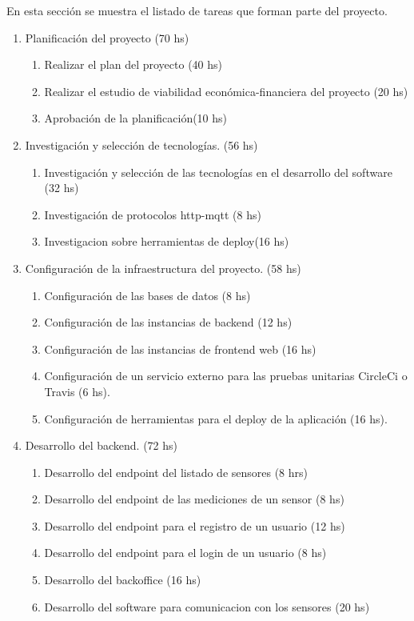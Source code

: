 \documentclass[
11pt, %
]{charter}
\begin{document}
En esta sección se muestra el listado de tareas que forman parte del proyecto.
\begin{enumerate}
\item Planificación del proyecto (70 hs)
	\begin{enumerate}
	\item Realizar el plan del proyecto (40 hs)
	\item Realizar el estudio de viabilidad económica-financiera del proyecto (20 hs)
	\item Aprobación de la planificación(10 hs)
	\end{enumerate}
\item Investigación y selección de tecnologías. (56 hs)
	\begin{enumerate}
	\item Investigación y selección de las tecnologías en el desarrollo del software (32 hs)
	\item Investigación de protocolos http-mqtt (8 hs)
	\item Investigacion sobre herramientas de deploy(16 hs)
	\end{enumerate}
\item Configuración de la infraestructura del proyecto. (58 hs)
	\begin{enumerate}
	\item Configuración de las bases de datos (8 hs)
	\item Configuración de las instancias de backend (12 hs)
	\item Configuración de las instancias de frontend web (16 hs)
	\item Configuración de un servicio externo para las pruebas unitarias CircleCi o Travis (6 hs).
	\item Configuración de herramientas para el deploy de la aplicación (16 hs).
	\end{enumerate}
\item Desarrollo del backend. (72 hs)
	\begin{enumerate}
	\item Desarrollo del endpoint del listado de sensores (8 hrs)
	\item Desarrollo del endpoint de las mediciones de un sensor  (8 hs)
	\item Desarrollo del endpoint para el registro de un usuario (12 hs)
	\item Desarrollo del endpoint para el login de un usuario  (8 hs)
	\item Desarrollo del backoffice (16 hs)
	\item Desarrollo del software para comunicacion con los sensores (20 hs)

\end{enumerate}
\end{enumerate}
\end{document}
